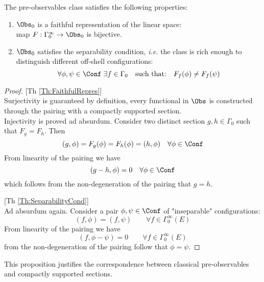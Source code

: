 \documentclass[Main]{subfiles}
\begin{document}
				\begin{proposition}
					The pre-observables class satisfies the following properties:
					\begin{enumerate}
						\item\label{Th:FaithfulRepres} $\Obs_0$ is a faithful representation of the linear space:\\
									map $F: \Gamma_0^\infty \rightarrow \Obs_0$ is bijective.
						\item\label{Th:SeparabilityCond} $\Obs_0$ satisfies the separability condition, \textit{i.e.} the class is rich enough to distinguish different off-shell configurations:
						\begin{displaymath}
							\forall \phi,\psi \in \Conf \; \exists f \in \Gamma_0 \quad \textrm{such that:} \quad F_f(\phi) \neq F_f(\psi)
						\end{displaymath}
					\end{enumerate}	
				\end{proposition}
				\begin{proof}
				
					[Th \ref{Th:FaithfulRepres}]\\
					Surjectivity is guaranteed by definition, every functional in $\Obs$ is constructed through the pairing with a compactly supported section.\\
					Injectivity is proved ad absurdum.
					Consider two distinct section $g,h \in \Gamma_0$ such that $F_g = F_h$. Then
					\begin{displaymath}
						 ( g, \phi) = F_g(\phi) = F_h(\phi) = (h, \phi)  \quad \forall \phi \in \Conf
					\end{displaymath}
					From linearity of the pairing we have 
					\begin{displaymath}
						(g-h, \phi) = 0 \quad\forall \phi \in \Conf
					\end{displaymath}
					which follows from the non-degeneration of the pairing that $g=h$.
					
					[Th \ref{Th:SeparabilityCond}]\\
					Ad absurdum again.
					Consider a pair $\phi,\psi \in \Conf$ of "inseparable" configurations:
					\begin{displaymath}
						(f, \phi) = (f, \psi) \qquad \forall f \in \Gamma_0^\infty(E)
					\end{displaymath}
					From linearity of the pairing we have 
					\begin{displaymath}
						(f, \phi-\psi) = 0 \qquad \forall f \in \Gamma_0^\infty(E)
					\end{displaymath}
					from the non-degeneration of the pairing follow that $\phi = \psi$.
				\end{proof}
				This proposition justifies the correspondence between classical pre-observables and compactly supported sections.
			
\end{document}
